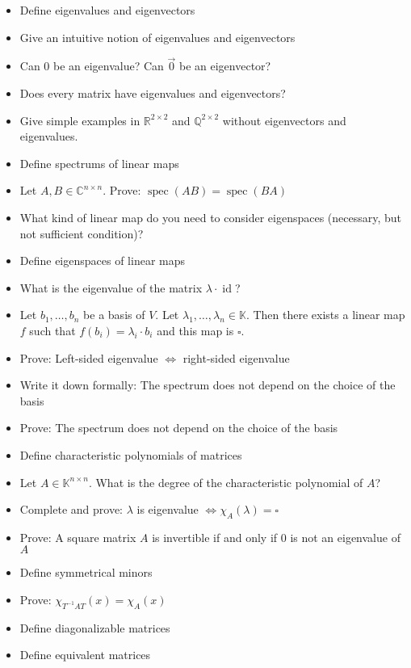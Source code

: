 \documentclass[a4paper]{article}
\begin{document}
\begin{itemize}
  \item Define eigenvalues and eigenvectors
  \item Give an intuitive notion of eigenvalues and eigenvectors
  \item Can 0 be an eigenvalue? Can $\vec 0$ be an eigenvector?
  \item Does every matrix have eigenvalues and eigenvectors?
  \item Give simple examples in $\mathbb R^{2 \times 2}$ and $\mathbb Q^{2 \times 2}$ without eigenvectors and eigenvalues.
  \item Define spectrums of linear maps
  \item Let $A, B \in \mathbb C^{n \times n}$. Prove: $\operatorname{spec}(AB) = \operatorname{spec}(BA)$
  \item What kind of linear map do you need to consider eigenspaces (necessary, but not sufficient condition)?
  \item Define eigenspaces of linear maps
  \item What is the eigenvalue of the matrix $\lambda \cdot \operatorname{id}$?
  \item Let $b_1, \dots, b_n$ be a basis of $V$. Let $\lambda_1, \dots, \lambda_n \in \mathbb K$. Then there exists a linear map $f$ such that $f(b_i) = \lambda_i \cdot b_i$ and this map is $\square{}$.
  \item Prove: Left-sided eigenvalue $\iff$ right-sided eigenvalue
  \item Write it down formally: The spectrum does not depend on the choice of the basis
  \item Prove: The spectrum does not depend on the choice of the basis
  \item Define characteristic polynomials of matrices
  \item Let $A \in \mathbb K^{n \times n}$. What is the degree of the characteristic polynomial of $A$?
  \item Complete and prove: $\lambda$ is eigenvalue $\iff \chi_A(\lambda) = \square{}$
  \item Prove: A square matrix $A$ is invertible if and only if $0$ is not an eigenvalue of $A$
  \item Define symmetrical minors
  \item Prove: $\chi_{T^{-1} AT}(x) = \chi_A(x)$
  \item Define diagonalizable matrices
  \item Define equivalent matrices

\end{itemize}
\end{document}
